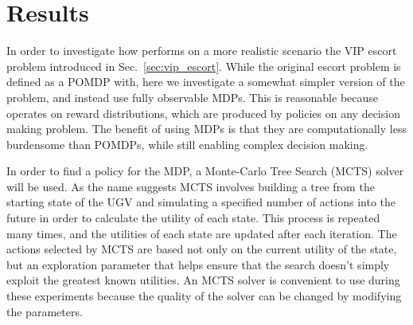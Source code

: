 \section{Results} \label{sec:results}
In order to investigate how \xQ{} performs on a more realistic scenario the VIP escort problem introduced in Sec.~\ref{sec:vip_escort}. While the original escort problem is defined as a POMDP with, here we investigate a somewhat simpler version of the problem, and instead use fully observable MDPs. This is reasonable because \xQ{} operates on reward distributions, which are produced by policies on any decision making problem. The benefit of using MDPs is that they are computationally less burdensome than POMDPs, while still enabling complex decision making.

In order to find a policy for the MDP, a Monte-Carlo Tree Search (MCTS) solver will be used. As the name suggests MCTS involves building a tree from the starting state of the UGV and simulating a specified number of actions into the future in order to calculate the utility of each state. This process is repeated many times, and the utilities of each state are updated after each iteration. The actions selected by MCTS are based not only on the current utility of the state, but an exploration parameter that helps ensure that the search doesn't simply exploit the greatest known utilities. An MCTS solver is convenient to use during these experiments because the quality of the solver can be changed by modifying the parameters.

